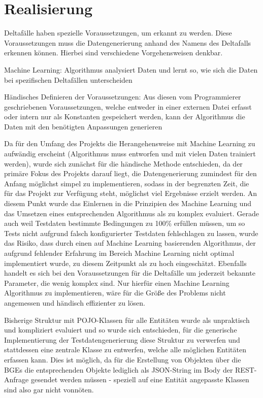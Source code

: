\chapter{Realisierung}\label{ch:realisierung}

Deltafälle haben spezielle Voraussetzungen, um erkannt zu werden. Diese Voraussetzungen muss die Datengenerierung anhand des Namens des Deltafalls erkennen können. Hierbei sind verschiedene Vorgehensweisen denkbar. 

Machine Learning: Algorithmus analysiert Daten und lernt so, wie sich die Daten bei spezifischen Deltafällen unterscheiden

Händisches Definieren der Voraussetzungen: Aus diesen vom Programmierer geschriebenen Voraussetzungen, welche entweder in einer externen Datei erfasst oder intern nur als Konstanten gespeichert werden, kann der Algorithmus die Daten mit den benötigten Anpassungen generieren

Da für den Umfang des Projekts die Herangehensweise mit Machine Learning zu aufwändig erscheint (Algorithmus muss entworfen und mit vielen Daten trainiert werden), wurde sich zunächst für die händische Methode entschieden, da der primäre Fokus des Projekts darauf liegt, die Datengenerierung zumindest für den Anfang möglichst simpel zu implementieren, sodass in der begrenzten Zeit, die für das Projekt zur Verfügung steht, möglichst viel Ergebnisse erzielt werden. An diesem Punkt wurde das Einlernen in die Prinzipien des Machine Learning und das Umsetzen eines entsprechenden Algorithmus als zu komplex evaluiert. Gerade auch weil Testdaten bestimmte Bedingungen zu 100\% erfüllen müssen, um so Tests nicht aufgrund falsch konfigurierter Testdaten fehlschlagen zu lassen, wurde das Risiko, dass durch einen auf Machine Learning basierenden Algorithmus, der aufgrund fehlender Erfahrung im Bereich Machine Learning nicht optimal implementiert wurde, zu diesem Zeitpunkt als zu hoch eingeschätzt. Ebenfalls handelt es sich bei den Voraussetzungen für die Deltafälle um jederzeit bekannte Parameter, die wenig komplex sind. Nur hierfür einen Machine Learning Algorithmus zu implementieren, wäre für die Größe des Problems nicht angemessen und händisch effizienter zu lösen.


Bisherige Struktur mit POJO-Klassen für alle Entitäten wurde als unpraktisch und kompliziert evaluiert und so wurde sich entschieden, für die generische Implementierung der Testdatengenerierung diese Struktur zu verwerfen und stattdessen eine zentrale Klasse zu entwerfen, welche alle möglichen Entitäten erfassen kann. Dies ist möglich, da für die Erstellung von Objekten über die BGEs die entsprechenden Objekte lediglich als JSON-String im Body der REST-Anfrage gesendet werden müssen - speziell auf eine Entität angepasste Klassen sind also gar nicht vonnöten.